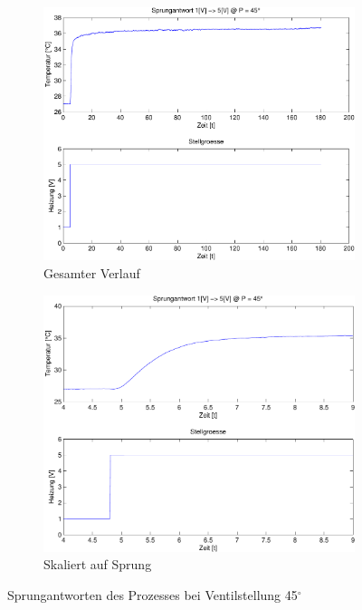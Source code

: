 \begin{figure}[h!]
	\begin{subfigure}{0.475\textwidth}
		\includegraphics[width=1\textwidth]{03/step_half.pdf}
		\caption{Gesamter Verlauf}
	\end{subfigure}
	\hfill{}
	\begin{subfigure}{0.475\textwidth}
		\includegraphics[width=1\textwidth]{03/step_half_scale.pdf}
		\caption{Skaliert auf Sprung}
	\end{subfigure}
	\caption{Sprungantworten des Prozesses bei Ventilstellung 45$^\circ$}
\end{figure}
